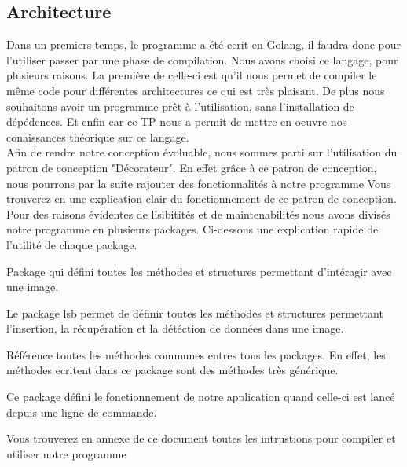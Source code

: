 \documentclass[letterpaper,12pt, french]{article}
\begin{document}
\subsection{Architecture}
\label{sec:org1344264}
Dans un premiers temps, le programme a été ecrit en Golang, il faudra donc pour l'utiliser passer par une phase de compilation. Nous avons choisi ce langage, pour plusieurs raisons. La première de celle-ci est qu'il nous permet de compiler le même code pour différentes architectures ce qui est très plaisant. De plus nous souhaitons avoir un programme prêt à l'utilisation, sans l'installation de dépédences. Et enfin car ce TP nous a permit de mettre en oeuvre nos conaissances théorique sur ce langage.
\vspace{1\baselineskip}
\\
Afin de rendre notre conception évoluable, nous sommes parti sur l'utilisation du patron de conception "Décorateur".
En effet grâce à ce patron de conception, nous pourrons par la suite rajouter des fonctionnalités à notre programme
Vous trouverez en \cite{noauthor_goprod_nodate} une explication clair du fonctionnement de ce patron de conception.
\vspace{1\baselineskip}
\\
Pour des raisons évidentes de lisibitités et de maintenabilités nous avons divisés notre programme en plusieurs
packages. Ci-dessous une explication rapide de l'utilité de chaque package.
\vspace{1\baselineskip}
\\
\begin{description}[style=multiline,leftmargin=1.5cm]
  \item[image]
    Package qui défini toutes les méthodes et structures permettant d'intéragir
    avec une image. 
  \item[lsb]
    Le package lsb permet de définir toutes les méthodes et structures permettant
    l'insertion, la récupération et la détéction de données dans une image.
  \item[utils]
    Référence toutes les méthodes communes entres tous les packages. En effet, les méthodes
    ecritent dans ce package sont des méthodes très générique.
  \item[cmd]
    Ce package défini le fonctionnement de notre application quand celle-ci est lancé depuis
    une ligne de commande.
\end{description}
\vspace{1\baselineskip}
\space
Vous trouverez en annexe de ce document toutes les intrustions pour compiler et utiliser notre programme
\end{document}
